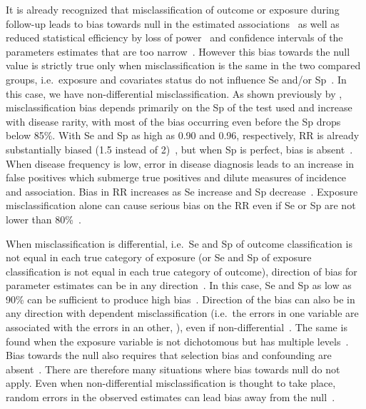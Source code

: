 It is already recognized that misclassification of outcome or exposure during
follow-up leads to bias towards null in the estimated
associations~\citep{Bross1954,Copeland1977,FLEGAL_1986} as well as reduced
statistical efficiency by loss of power~\citep{WHITE_1986} and confidence
intervals of the parameters estimates that are too narrow~\citep{Neuhaus_1999}.
However this bias towards the null value is strictly true only when
misclassification is the same in the two compared groups, i.e.\ exposure and
covariates status do not influence Se and/or
Sp~\citep{Copeland1977,Sorahan_1994,Neuhaus_1999}.
In this case, we have non-differential misclassification.
As shown previously by \cite{Copeland1977}, misclassification bias depends
primarily on the Sp of the test used and increase with disease rarity, with most
of the bias occurring even before the Sp drops below 85\%.
With Se and Sp as high as 0.90 and 0.96, respectively, RR is already
substantially biased (1.5 instead of 2)~\citep{Copeland1977}, but when Sp is
perfect, bias is absent~\citep{Poole1985}.
When disease frequency is low, error in disease diagnosis leads to an increase
in false positives which submerge true positives and dilute measures of
incidence and association.
Bias in RR increases as Se increase and Sp decrease~\citep{WHITE_1986}.
Exposure misclassification alone can cause serious bias on the RR even if Se or
Sp are not lower than 80\%~\citep{Kristensen_1992}.

When misclassification is differential, i.e.\ Se and Sp of outcome
classification is not equal in each true category of exposure (or Se and Sp of
exposure classification is not equal in each true category of outcome),
direction of bias for parameter estimates can be in any
direction~\citep{Dosemeci_1990,Neuhaus_1999,Chen_2013}.
In this case, Se and Sp as low as 90\% can be sufficient to produce high
bias~\citep{Kristensen_1992}.
Direction of the bias can also be in any direction with dependent
misclassification (i.e.\ the errors in one variable are associated with the
errors in an other, \citealp{Assakul_1967,Greenland_1989}), even if
non-differential~\citep{Kristensen_1992}.
The same is found when the exposure variable is not dichotomous but has multiple
levels~\citep{Dosemeci_1990,Weinberg_1994}.
Bias towards the null also requires that selection bias and confounding are
absent~\citep{Jurek_2004}.
There are therefore many situations where bias towards null do not apply.
Even when non-differential misclassification is thought to take place, random
errors in the observed estimates can lead bias away from the
null~\citep{Jurek_2004}.

